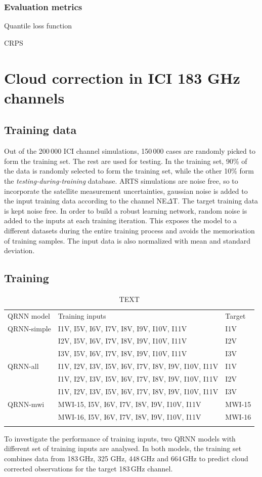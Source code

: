 \documentclass[amt, manuscript]{copernicus}
\begin{document}
\subsubsection{Evaluation metrics}

Quantile loss function

CRPS


\section{Cloud correction in ICI 183 GHz channels}
%
\subsection{Training data}
%
Out of the 200\,000 ICI channel simulations, 150\,000 cases are randomly picked to form the training set. The rest are used for testing. In the training set, 90\% of the data is randomly selected to form the training set, while the other 10\% form the \textit{testing-during-training} database. ARTS simulations are noise free, so to incorporate the satellite measurement uncertainties, gaussian noise is added to the input training data according to the channel NE$\Delta$T. The target training data is kept noise free. In order to build a robust learning network, random noise is added to the inputs at each training iteration. This exposes the model to a different datasets during the entire training process and avoids the memorisation of training samples. The input data is also normalized with mean and standard deviation.

\subsection{Training}
%
\begin{table}[t]
\label{tab:QRNN_models}	
\caption{TEXT}
\begin{tabular}{lll}
\tophline
QRNN model & Training inputs & Target \\
\middlehline
QRNN-simple & I1V, I5V, I6V, I7V, I8V, I9V, I10V, I11V & I1V\\
			& I2V, I5V, I6V, I7V, I8V, I9V, I10V, I11V & I2V\\
			& I3V, I5V, I6V, I7V, I8V, I9V, I10V, I11V & I3V\\
QRNN-all    & I1V, I2V, I3V, I5V, I6V, I7V, I8V, I9V, I10V, I11V & I1V\\	
			& I1V, I2V, I3V, I5V, I6V, I7V, I8V, I9V, I10V, I11V & I2V\\	
			& I1V, I2V, I3V, I5V, I6V, I7V, I8V, I9V, I10V, I11V & I3V\\
QRNN-mwi	& MWI-15, I5V, I6V, I7V, I8V, I9V, I10V, I11V & MWI-15\\	
			& MWI-16, I5V, I6V, I7V, I8V, I9V, I10V, I11V & MWI-16\\			
\bottomhline
\end{tabular}
\belowtable{} %
\end{table}
To investigate the performance of training inputs, two QRNN models with different set of training inputs are analysed. In both models, the training set combines data from 183\,GHz, 325 GHz, 448\,GHz and 664\,GHz to predict cloud corrected observations for the target 183\,GHz channel.
\end{document}
